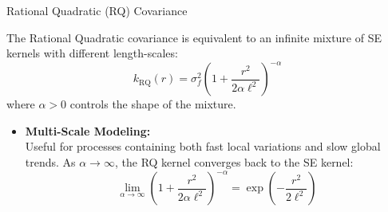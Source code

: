 \documentclass[aspectratio=169, 10pt]{beamer}
\begin{document}
\begin{frame}{Rational Quadratic (RQ) Covariance}
  
  The Rational Quadratic covariance is equivalent to an infinite mixture of SE kernels with different length-scales:
  \[
    k_{\text{RQ}}(r) = \sigma_f^2 \left(1 + \frac{r^2}{2\alpha \ell^2}\right)^{-\alpha}
  \]
  where $\alpha > 0$ controls the shape of the mixture.
  \begin{itemize}
    \item \textbf{Multi-Scale Modeling:}\\
      Useful for processes containing both fast local variations and slow global trends. As $\alpha \to \infty$, the RQ kernel converges back to the SE kernel:
      \[
        \lim_{\alpha \to \infty} \left(1 + \frac{r^2}{2\alpha \ell^2}\right)^{-\alpha} = \exp\left(-\frac{r^2}{2\ell^2}\right)
      \]
  \end{itemize}
\end{frame}



\end{document}
